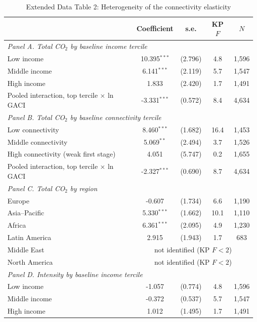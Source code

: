 \begin{table}[htbp]
\centering
\begin{threeparttable}
\caption{Extended Data Table 2: Heterogeneity of the connectivity elasticity}
\label{tab:hetero}
\footnotesize
\begin{tabular}{lcccc}
\toprule
 & Coefficient & s.e. & KP $F$ & $N$ \\
\midrule
\multicolumn{5}{l}{\textit{Panel A. Total CO$_2$ by baseline income tercile}} \\
  Low income & 10.395$^{***}$ & (2.796) & 4.8 & 1,596 \\
  Middle income & 6.141$^{***}$ & (2.119) & 5.7 & 1,547 \\
  High income & 1.833 & (2.420) & 1.7 & 1,491 \\
  \quad Pooled interaction, top tercile $\times$ ln GACI & -3.331$^{***}$ & (0.572) & 8.4 & 4,634 \\
\midrule
\multicolumn{5}{l}{\textit{Panel B. Total CO$_2$ by baseline connectivity tercile}} \\
  Low connectivity & 8.460$^{***}$ & (1.682) & 16.4 & 1,453 \\
  Middle connectivity & 5.069$^{**}$ & (2.494) & 3.7 & 1,526 \\
  High connectivity (weak first stage) & 4.051 & (5.747) & 0.2 & 1,655 \\
  \quad Pooled interaction, top tercile $\times$ ln GACI & -2.327$^{***}$ & (0.690) & 8.7 & 4,634 \\
\midrule
\multicolumn{5}{l}{\textit{Panel C. Total CO$_2$ by region}} \\
  Europe & -0.607 & (1.734) & 6.6 & 1,190 \\
  Asia--Pacific & 5.330$^{***}$ & (1.662) & 10.1 & 1,110 \\
  Africa & 6.361$^{***}$ & (2.095) & 4.9 & 1,230 \\
  Latin America & 2.915 & (1.943) & 1.7 & 683 \\
  Middle East & \multicolumn{4}{c}{not identified (KP $F<2$)} \\
  North America & \multicolumn{4}{c}{not identified (KP $F<2$)} \\
\midrule
\multicolumn{5}{l}{\textit{Panel D. Intensity by baseline income tercile}} \\
  Low income & -1.057 & (0.774) & 4.8 & 1,596 \\
  Middle income & -0.372 & (0.537) & 5.7 & 1,547 \\
  High income & 1.012 & (1.495) & 1.7 & 1,491 \\

\end{tabular}
\end{threeparttable}
\end{table}
